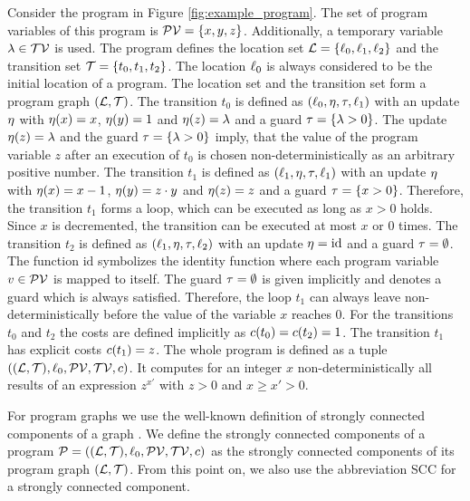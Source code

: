 \begin{example}[Program]
  
  Consider the program in Figure \ref{fig:example_program}.
  The set of program variables of this program is $\mathcal{PV} = \lbrace x,y,z \rbrace$.
  Additionally, a temporary variable $\lambda \in \mathcal{TV}$ is used.
  The program defines the location set $\mathcal{L} = \lbrace \ell_0,\ell_1,\ell_2 \rbrace$ and the transition set $\mathcal{T} = \lbrace t_0,t_1,t_2 \rbrace$.
  The location $\ell_0$ is always considered to be the initial location of a program.
  The location set and the transition set form a program graph $(\mathcal{L}, \mathcal{T})$.
  The transition $t_0$ is defined as $(\ell_0,\eta,\tau,\ell_1)$ with an update $\eta$ with $\eta(x)=x$, $\eta(y)=1$ and $\eta(z)=\lambda$ and a guard $\tau = \lbrace \lambda > 0 \rbrace$.
  The update $\eta(z)=\lambda$ and the guard $\tau = \lbrace \lambda > 0 \rbrace$ imply, that the value of the program variable $z$ after an execution of $t_0$ is chosen non-deterministically as an arbitrary positive number.
  The transition $t_1$ is defined as $(\ell_1,\eta,\tau,\ell_1)$ with an update $\eta$ with $\eta(x)=x-1$, $\eta(y)=z \cdot y$ and $\eta(z)=z$ and a guard $\tau = \lbrace x > 0 \rbrace$.
  Therefore, the transition $t_1$ forms a loop, which can be executed as long as $x > 0$ holds.
  Since $x$ is decremented, the transition can be executed at most $x$ or $0$ times.
  The transition $t_2$ is defined as $(\ell_1,\eta,\tau,\ell_2)$ with an update $\eta = \text{id}$ and a guard $\tau = \emptyset$.
  The function $\text{id}$ symbolizes the identity function where each program variable $v \in \mathcal{PV}$ is mapped to itself.
  The guard $\tau = \emptyset$ is given implicitly and denotes a guard which is always satisfied.
  Therefore, the loop $t_1$ can always leave non-deterministically before the value of the variable $x$ reaches $0$.
  For the transitions $t_0$ and $t_2$ the costs are defined implicitly as $c(t_0) = c(t_2) = 1$.
  The transition $t_1$ has explicit costs $c(t_1) = z$.
  The whole program is defined as a tuple $((\mathcal{L}, \mathcal{T}), \ell_0, \mathcal{PV}, \mathcal{TV}, c)$.
  It computes for an integer $x$ non-deterministically all results of an expression $z^{x'}$ with $z > 0$ and $x \geq x' > 0$.  
\end{example}

For program graphs we use the well-known definition of strongly connected components of a graph \cite{sccs}.
We define the strongly connected components of a program $\mathcal{P} = ((\mathcal{L}, \mathcal{T}), \ell_0, \mathcal{PV}, \mathcal{TV}, c)$ as the strongly connected components of its program graph $(\mathcal{L}, \mathcal{T})$.
From this point on, we also use the abbreviation SCC for a strongly connected component.

